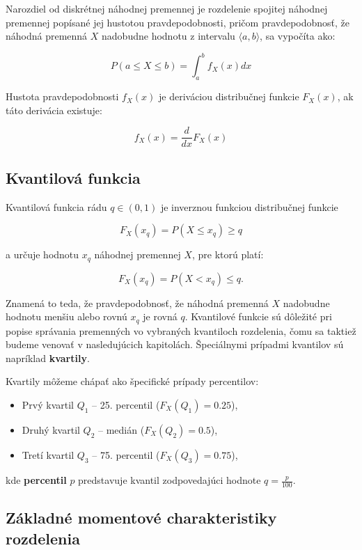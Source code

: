 Narozdiel od diskrétnej náhodnej premennej je rozdelenie spojitej náhodnej premennej popísané jej hustotou pravdepodobnosti, pričom pravdepodobnosť, že náhodná premenná $X$ nadobudne hodnotu z intervalu $\langle a, b \rangle$, sa vypočíta ako: 

\begin{equation*}
P(a \leq X \leq b) = \int_{a}^{b} f_X(x)dx 
\end{equation*}

Hustota pravdepodobnosti $f_X(x)$ je deriváciou distribučnej funkcie $F_X(x)$, ak táto derivácia existuje: 

\begin{equation*} 
f_X(x) = \frac{d}{dx} F_X(x) 
\end{equation*}

\subsection{Kvantilová funkcia}

Kvantilová funkcia rádu $q \in (0, 1)$ je inverznou funkciou distribučnej funkcie

\[
F_X(x_q) = P(X \leq x_q) \geq q
\]

a určuje hodnotu $x_q$ náhodnej premennej $X$, pre ktorú platí:

\[
F_X(x_q) = P(X < x_q) \leq q.
\]

Znamená to teda, že pravdepodobnosť, že náhodná premenná $X$ nadobudne hodnotu menšiu alebo rovnú $x_q$ je rovná $q$. Kvantilové funkcie sú dôležité pri popise správania premenných vo vybraných kvantiloch rozdelenia, čomu sa taktiež budeme venovať v nasledujúcich kapitolách. Špeciálnymi prípadmi kvantilov sú napríklad \textbf{kvartily}.

Kvartily môžeme chápať ako špecifické prípady percentilov:
\begin{itemize}
  \item Prvý kvartil $Q_1$ – 25. percentil ($F_X(Q_1) = 0.25$),
  \item Druhý kvartil $Q_2$ – medián ($F_X(Q_2) = 0.5$),
  \item Tretí kvartil $Q_3$ – 75. percentil ($F_X(Q_3) = 0.75$),
\end{itemize}

kde \textbf{percentil} $p$ predstavuje kvantil zodpovedajúci hodnote $q = \frac{p}{100}$. \\

\subsection{Základné momentové charakteristiky rozdelenia}

